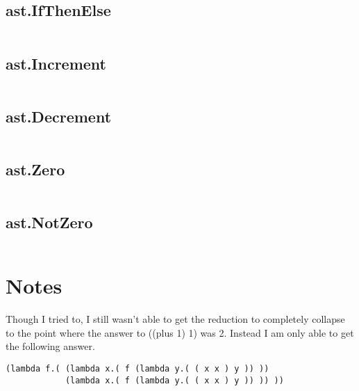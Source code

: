 \documentclass[11pt, numbers=endperiod, parskip=half]{scrartcl}
\begin{document}
\subsection{ast.IfThenElse}
\inputminted[tabsize=2]{java}{LCLParser/src/ast/IfThenElse.java}

\subsection{ast.Increment}
\inputminted[tabsize=2]{java}{LCLParser/src/ast/Increment.java}

\subsection{ast.Decrement}
\inputminted[tabsize=2]{java}{LCLParser/src/ast/Decrement.java}

\subsection{ast.Zero}
\inputminted[tabsize=2]{java}{LCLParser/src/ast/Zero.java}

\subsection{ast.NotZero}
\inputminted[tabsize=2]{java}{LCLParser/src/ast/NotZero.java}

\restoregeometry
\section{Notes}
Though I tried to, I still wasn't able to get the reduction to completely
collapse to the point where the answer to ((plus 1) 1) was 2. Instead
I am only able to get the following answer.
\begin{verbatim}
(lambda f.( (lambda x.( f (lambda y.( ( x x ) y )) ))
            (lambda x.( f (lambda y.( ( x x ) y )) )) ))

\end{verbatim}
\end{document}
